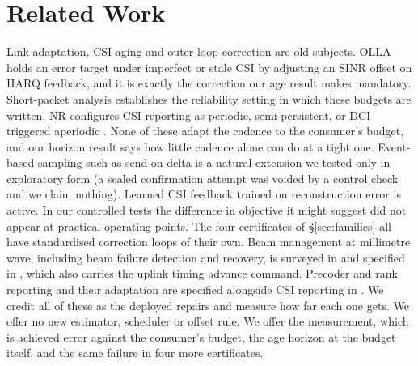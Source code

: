 \documentclass[conference]{IEEEtran}
\begin{document}
\section{Related Work}
Link adaptation, CSI aging and outer-loop correction are old subjects. OLLA
\cite{olla} holds an error target under imperfect or stale CSI by adjusting an
SINR offset on HARQ feedback, and it is exactly the correction our age result
makes mandatory. Short-packet analysis \cite{urllc} establishes the reliability
setting in which these budgets are written. NR configures CSI reporting as
periodic, semi-persistent, or DCI-triggered aperiodic \cite{cqireport}. None of
these adapt the cadence to the consumer's budget, and our horizon result says how
little cadence alone can do at a tight one. Event-based sampling such as
send-on-delta \cite{sod} is a natural extension we tested only in exploratory
form (a sealed confirmation attempt was voided by a control check and we claim
nothing).
Learned CSI feedback trained on reconstruction error \cite{csinet} is active.
In our controlled tests the difference in objective it might suggest did not
appear at practical operating points. The four certificates of
\S\ref{sec:families} all have standardised correction loops of their own. Beam
management at millimetre wave, including beam failure detection and recovery, is
surveyed in \cite{beamtut} and specified in \cite{ts38213}, which also carries
the uplink timing advance command. Precoder and rank reporting and their
adaptation are specified alongside CSI reporting in \cite{cqireport}. We credit
all of these as the deployed repairs and measure how far each one gets. We offer
no new estimator, scheduler or offset rule. We offer the measurement, which is
achieved error against the consumer's budget, the age horizon at the budget
itself, and the same failure in four more certificates.
\end{document}
